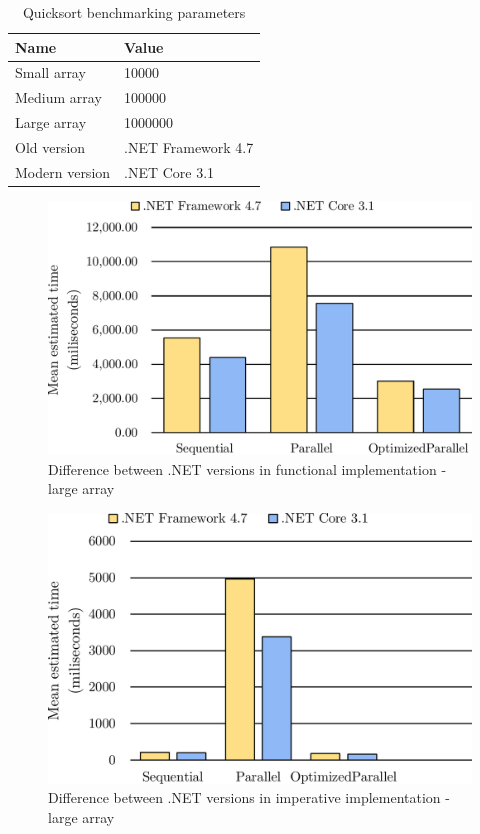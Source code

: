 \begin{table}[!ht]
    \centering
    \caption{Quicksort benchmarking parameters}
		\label{tab:QuicksortParameters}
    \begin{tabular}{p{3cm}p{4cm}}
			\toprule
			\bfseries Name 	&
			\bfseries Value \\
			\midrule
			Small array & 10000  \\
			Medium array & 100000 \\
			Large array & 1000000 \\
			Old version & .NET Framework 4.7 \\ 
			Modern version & .NET Core 3.1 \\ 
			\bottomrule
    \end{tabular}
\end{table}

\begin{figure}[htb]
\centering
\includegraphics[width=.62\linewidth]{figures04/47vsCoreFunc1000000.pdf}
\caption{Difference between .NET versions in functional implementation - large array}
\label{fig:47vsCoreFunc1000000}
\end{figure}

\begin{figure}[htb]
\centering
\includegraphics[width=.62\linewidth]{figures04/47vsCoreImp1000000.pdf}
\caption{Difference between .NET versions in imperative implementation - large array}
\label{fig:47vsCoreImp1000000}
\end{figure}

